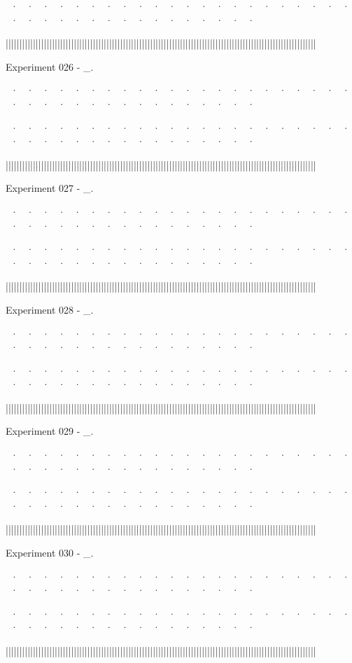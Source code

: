 ~· ~· ~· ~· ~· ~· ~· ~· ~· ~· ~· ~· ~· ~· ~· ~· ~· ~· ~· ~· ~· ~· ~· ~· ~· ~· ~· ~· ~· ~· ~· ~· ~· ~· ~· ~· ~· ~· 



||||||||||||||||||||||||||||||||||||||||||||||||||||||||||||||||||||||||||||||||||||||||||||||||||||||||||||||||||


Experiment 026 - _. 


~· ~· ~· ~· ~· ~· ~· ~· ~· ~· ~· ~· ~· ~· ~· ~· ~· ~· ~· ~· ~· ~· ~· ~· ~· ~· ~· ~· ~· ~· ~· ~· ~· ~· ~· ~· ~· ~· 

~· ~· ~· ~· ~· ~· ~· ~· ~· ~· ~· ~· ~· ~· ~· ~· ~· ~· ~· ~· ~· ~· ~· ~· ~· ~· ~· ~· ~· ~· ~· ~· ~· ~· ~· ~· ~· ~· 



||||||||||||||||||||||||||||||||||||||||||||||||||||||||||||||||||||||||||||||||||||||||||||||||||||||||||||||||||


Experiment 027 - _. 


~· ~· ~· ~· ~· ~· ~· ~· ~· ~· ~· ~· ~· ~· ~· ~· ~· ~· ~· ~· ~· ~· ~· ~· ~· ~· ~· ~· ~· ~· ~· ~· ~· ~· ~· ~· ~· ~· 

~· ~· ~· ~· ~· ~· ~· ~· ~· ~· ~· ~· ~· ~· ~· ~· ~· ~· ~· ~· ~· ~· ~· ~· ~· ~· ~· ~· ~· ~· ~· ~· ~· ~· ~· ~· ~· ~· 



||||||||||||||||||||||||||||||||||||||||||||||||||||||||||||||||||||||||||||||||||||||||||||||||||||||||||||||||||


Experiment 028 - _. 


~· ~· ~· ~· ~· ~· ~· ~· ~· ~· ~· ~· ~· ~· ~· ~· ~· ~· ~· ~· ~· ~· ~· ~· ~· ~· ~· ~· ~· ~· ~· ~· ~· ~· ~· ~· ~· ~· 

~· ~· ~· ~· ~· ~· ~· ~· ~· ~· ~· ~· ~· ~· ~· ~· ~· ~· ~· ~· ~· ~· ~· ~· ~· ~· ~· ~· ~· ~· ~· ~· ~· ~· ~· ~· ~· ~· 



||||||||||||||||||||||||||||||||||||||||||||||||||||||||||||||||||||||||||||||||||||||||||||||||||||||||||||||||||


Experiment 029 - _. 


~· ~· ~· ~· ~· ~· ~· ~· ~· ~· ~· ~· ~· ~· ~· ~· ~· ~· ~· ~· ~· ~· ~· ~· ~· ~· ~· ~· ~· ~· ~· ~· ~· ~· ~· ~· ~· ~· 

~· ~· ~· ~· ~· ~· ~· ~· ~· ~· ~· ~· ~· ~· ~· ~· ~· ~· ~· ~· ~· ~· ~· ~· ~· ~· ~· ~· ~· ~· ~· ~· ~· ~· ~· ~· ~· ~· 



||||||||||||||||||||||||||||||||||||||||||||||||||||||||||||||||||||||||||||||||||||||||||||||||||||||||||||||||||


Experiment 030 - _. 


~· ~· ~· ~· ~· ~· ~· ~· ~· ~· ~· ~· ~· ~· ~· ~· ~· ~· ~· ~· ~· ~· ~· ~· ~· ~· ~· ~· ~· ~· ~· ~· ~· ~· ~· ~· ~· ~· 

~· ~· ~· ~· ~· ~· ~· ~· ~· ~· ~· ~· ~· ~· ~· ~· ~· ~· ~· ~· ~· ~· ~· ~· ~· ~· ~· ~· ~· ~· ~· ~· ~· ~· ~· ~· ~· ~· 



||||||||||||||||||||||||||||||||||||||||||||||||||||||||||||||||||||||||||||||||||||||||||||||||||||||||||||||||||








